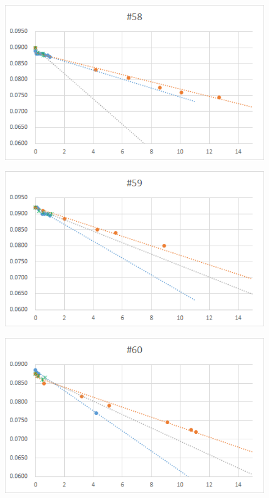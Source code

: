   \begin{figure}[htbp]
    \centering
       \includegraphics[width=120mm]{vol_058.png}
  \end{figure}
  \begin{figure}[htbp]
    \centering
       \includegraphics[width=120mm]{vol_059.png}
  \end{figure}
  \begin{figure}[htbp]
    \centering
       \includegraphics[width=120mm]{vol_060.png}
  \end{figure}
